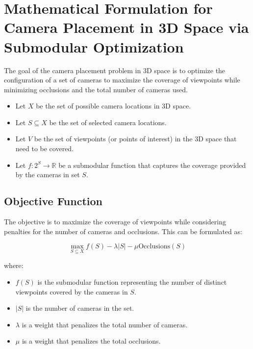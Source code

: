 \section{Mathematical Formulation for Camera Placement in 3D Space via Submodular Optimization}


The goal of the camera placement problem in 3D space is to optimize the configuration of a set of cameras to maximize the coverage of viewpoints while minimizing occlusions and the total number of cameras used.


\begin{itemize}
	\item Let \( X \) be the set of possible camera locations in 3D space.
	\item Let \( S \subseteq X \) be the set of selected camera locations.
	\item Let \( V \) be the set of viewpoints (or points of interest) in the 3D space that need to be covered.
	\item Let \( f: 2^S \to \mathbb{R} \) be a submodular function that captures the coverage provided by the cameras in set \( S \).
\end{itemize}

\subsection*{Objective Function}

The objective is to maximize the coverage of viewpoints while considering penalties for the number of cameras and occlusions. This can be formulated as:

\[
\max_{S \subseteq X} f(S) - \lambda |S| - \mu \text{Occlusions}(S)
\]

where:
\begin{itemize}
	\item \( f(S) \) is the submodular function representing the number of distinct viewpoints covered by the cameras in \( S \).
	\item \( |S| \) is the number of cameras in the set.
	\item \( \lambda \) is a weight that penalizes the total number of cameras.
	\item \( \mu \) is a weight that penalizes the total occlusions.
\end{itemize}

